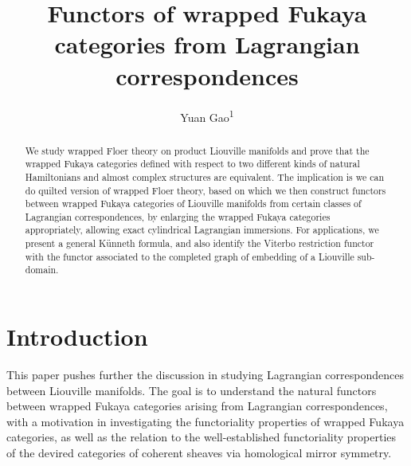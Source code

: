 \documentclass{amsart}
\title[Functors of wrapped Fukaya categories]{Functors of wrapped Fukaya categories from Lagrangian correspondences}
\author[Yuan Gao]{Yuan Gao\textsuperscript{1}}
\numberwithin{equation}{section}
\numberwithin{figure}{section}
\begin{document}
\begin{abstract}
	We study wrapped Floer theory on product Liouville manifolds and prove that the wrapped Fukaya categories defined with respect to two different kinds of natural Hamiltonians and almost complex structures are equivalent. The implication is we can do quilted version of wrapped Floer theory, based on which we then construct functors between wrapped Fukaya categories of Liouville manifolds from certain classes of Lagrangian correspondences, by enlarging the wrapped Fukaya categories appropriately, allowing exact cylindrical Lagrangian immersions. For applications, we present a general K\"{u}nneth formula, and also identify the Viterbo restriction functor with the functor associated to the completed graph of embedding of a Liouville sub-domain.
\end{abstract}

\maketitle

\section{Introduction}

	This paper pushes further the discussion in \cite{Gao1} studying Lagrangian correspondences between Liouville manifolds. The goal is to understand the natural functors between wrapped Fukaya categories arising from Lagrangian correspondences, with a motivation in investigating the functoriality properties of wrapped Fukaya categories, as well as the relation to the well-established functoriality properties of the devired categories of coherent sheaves via homological mirror symmetry. \par
\end{document}
